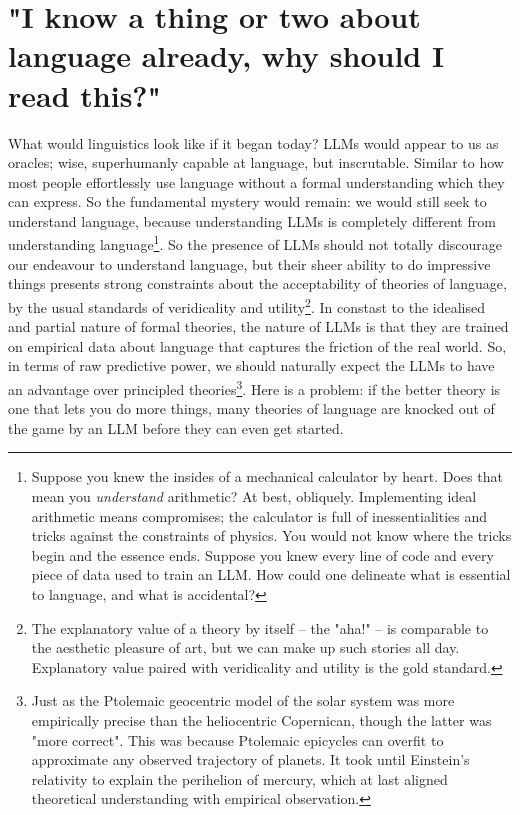 \section{"I know a thing or two about language already, why should I read this?"}
What would linguistics look like if it began today? LLMs would appear to us as oracles; wise, superhumanly capable at language, but inscrutable. Similar to how most people effortlessly use language without a formal understanding which they can express. So the fundamental mystery would remain: we would still seek to understand language, because understanding LLMs is completely different from understanding language\footnote{
Suppose you knew the insides of a mechanical calculator by heart.
Does that mean you \emph{understand} arithmetic?
At best, obliquely.
Implementing ideal arithmetic means compromises;
the calculator is full of inessentialities and tricks against the constraints of physics.
You would not know where the tricks begin and the essence ends.
Suppose you knew every line of code and every piece of data used to train an LLM.
How could one delineate what is essential to language, and what is accidental?}. So the presence of LLMs should not totally discourage our endeavour to understand language, but their sheer ability to do impressive things presents strong constraints about the acceptability of theories of language, by the usual standards of veridicality and utility\footnote{The explanatory value of a theory by itself -- the "aha!" -- is comparable to the aesthetic pleasure of art, but we can make up such stories all day. Explanatory value paired with veridicality and utility is the gold standard.}. In constast to the idealised and partial nature of formal theories, the nature of LLMs is that they are trained on empirical data about language that captures the friction of the real world. So, in terms of raw predictive power, we should naturally expect the LLMs to have an advantage over principled theories\footnote{Just as the Ptolemaic geocentric model of the solar system was more empirically precise than the heliocentric Copernican, though the latter was "more correct". This was because Ptolemaic epicycles can overfit to approximate any observed trajectory of planets. It took until Einstein's relativity to explain the perihelion of mercury, which at last aligned theoretical understanding with empirical observation.}. Here is a problem: if the better theory is one that lets you do more things, many theories of language are knocked out of the game by an LLM before they can even get started.

